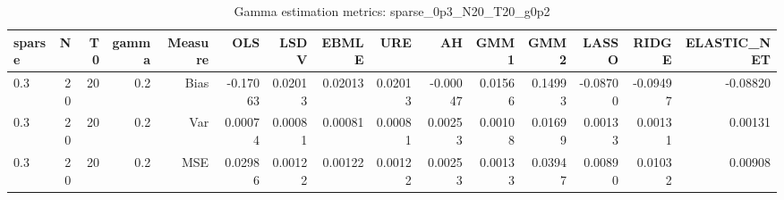 \begin{table}[!htbp]\centering
\caption{Gamma estimation metrics: sparse_0p3_N20_T20_g0p2}
\label{tab:table1_sparse_0p3_N20_T20_g0p2}
\begin{tabular}{lrrrrrrrrrrrrrr}
\hline
sparse & N & T0 & gamma & Measure & OLS & LSDV & EBMLE & URE & AH & GMM1 & GMM2 & LASSO & RIDGE & ELASTIC_NET \\
\hline
0.3 & 20 & 20 & 0.2 & Bias & -0.17063 & 0.02013 & 0.02013 & 0.02013 & -0.00047 & 0.01566 & 0.14993 & -0.08700 & -0.09497 & -0.08820 \\
0.3 & 20 & 20 & 0.2 & Var & 0.00074 & 0.00081 & 0.00081 & 0.00081 & 0.00253 & 0.00108 & 0.01699 & 0.00133 & 0.00131 & 0.00131 \\
0.3 & 20 & 20 & 0.2 & MSE & 0.02986 & 0.00122 & 0.00122 & 0.00122 & 0.00253 & 0.00133 & 0.03947 & 0.00890 & 0.01032 & 0.00908 \\
\hline
\end{tabular}
\end{table}

